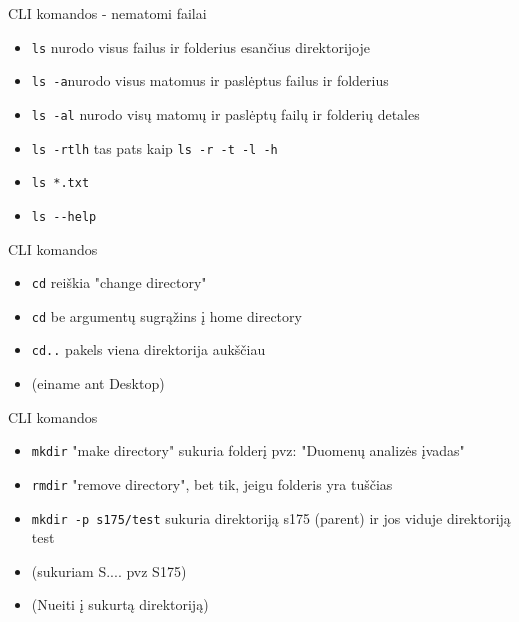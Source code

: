 \documentclass[11pt,xcolor=table]{beamer}
\begin{document}
\begin{frame}{CLI komandos - nematomi failai}
\begin{itemize}
\item \colorbox{listinggray}{\lstinline|ls|} nurodo visus failus ir folderius esančius direktorijoje
\item \colorbox{listinggray}{\lstinline|ls -a|}nurodo visus matomus ir paslėptus failus ir folderius
\item \colorbox{listinggray}{\lstinline|ls -al|} nurodo visų matomų ir paslėptų failų ir folderių detales
\item \colorbox{listinggray}{\lstinline|ls -rtlh|} tas pats kaip \colorbox{listinggray}{\lstinline|ls -r -t -l -h|}
\item \colorbox{listinggray}{\lstinline|ls *.txt|}
\item \colorbox{listinggray}{\lstinline|ls --help|} 
\end{itemize}
\end{frame}


\begin{frame}{CLI komandos}
\begin{itemize}
\item \colorbox{listinggray}{\lstinline|cd|}  reiškia "change directory"
\item \colorbox{listinggray}{\lstinline|cd|}  be argumentų sugrąžins į home directory
\item \colorbox{listinggray}{\lstinline|cd..|} pakels viena direktorija aukščiau
\item (einame ant Desktop)
\end{itemize}
\end{frame}

\begin{frame}{CLI komandos}
\begin{itemize}
\item \colorbox{listinggray}{\lstinline|mkdir|}  "make directory"  sukuria folderį pvz: "Duomenų analizės įvadas"
\item \colorbox{listinggray}{\lstinline|rmdir|} "remove directory", bet tik, jeigu folderis yra tuščias
\item \colorbox{listinggray}{\lstinline|mkdir -p s175/test|} sukuria direktoriją s175 (parent) ir jos viduje direktoriją test 
\item (sukuriam S.... pvz S175)
\item (Nueiti į sukurtą direktoriją)
\end{itemize}
\end{frame}
\end{document}
